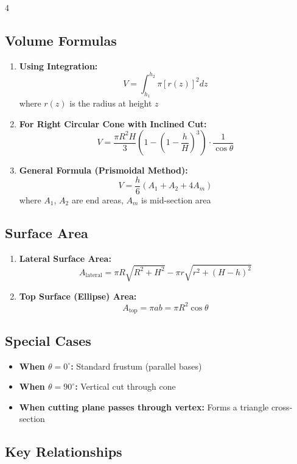 \begin{multicols*}{4}
\subsection*{Volume Formulas}

\begin{enumerate}
    \item \textbf{Using Integration:}
          \[ V = \int_{h_1}^{h_2} \pi [r(z)]^2  dz \]
          where $r(z)$ is the radius at height $z$
    
    \item \textbf{For Right Circular Cone with Inclined Cut:}
          \[ V = \frac{\pi R^2 H}{3} \left(1 - \left(1 - \frac{h}{H}\right)^3\right) \cdot \frac{1}{\cos\theta} \]
    
    \item \textbf{General Formula (Prismoidal Method):}
          \[ V = \frac{h}{6} \left(A_1 + A_2 + 4A_m\right) \]
          where $A_1$, $A_2$ are end areas, $A_m$ is mid-section area
\end{enumerate}

\subsection*{Surface Area}

\begin{enumerate}
    \item \textbf{Lateral Surface Area:}
          \[ A_{\text{lateral}} = \pi R \sqrt{R^2 + H^2} - \pi r \sqrt{r^2 + (H-h)^2} \]
    
    \item \textbf{Top Surface (Ellipse) Area:}
          \[ A_{\text{top}} = \pi ab = \pi R^2 \cos\theta \]
\end{enumerate}

\subsection*{Special Cases}

\begin{itemize}
    \item \textbf{When $\theta = 0^\circ$:} Standard frustum (parallel bases)
    \item \textbf{When $\theta = 90^\circ$:} Vertical cut through cone
    \item \textbf{When cutting plane passes through vertex:} Forms a triangle cross-section
\end{itemize}

\subsection*{Key Relationships}


\end{multicols*}
